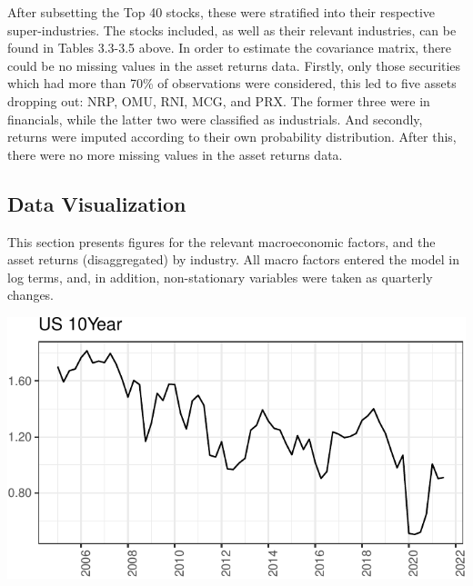 \documentclass[11pt,preprint, authoryear]{elsarticle}
\let\origfigure\figure
\let\endorigfigure\endfigure
\renewenvironment{figure}[1][2] {
    \expandafter\origfigure\expandafter[H]
} {
    \endorigfigure
}
\numberwithin{equation}{section}
\numberwithin{figure}{section}
\numberwithin{table}{section}
\begin{document}
\newpage

After subsetting the Top 40 stocks, these were stratified into their
respective super-industries. The stocks included, as well as their
relevant industries, can be found in Tables 3.3-3.5 above. In order to
estimate the covariance matrix, there could be no missing values in the
asset returns data. Firstly, only those securities which had more than
70\% of observations were considered, this led to five assets dropping
out: NRP, OMU, RNI, MCG, and PRX. The former three were in financials,
while the latter two were classified as industrials. And secondly,
returns were imputed according to their own probability distribution.
After this, there were no more missing values in the asset returns data.

\hypertarget{data-visualization}{%
\subsection{Data Visualization}\label{data-visualization}}

This section presents figures for the relevant macroeconomic factors,
and the asset returns (disaggregated) by industry. All macro factors
entered the model in log terms, and, in addition, non-stationary
variables were taken as quarterly changes.

\begin{figure}[H]
\includegraphics{Factor-Model_files/figure-latex/unnamed-chunk-3-1} \caption{US Long-Term Bond Yields \label{Fig1}}\label{fig:unnamed-chunk-3}
\end{figure}
\end{document}
